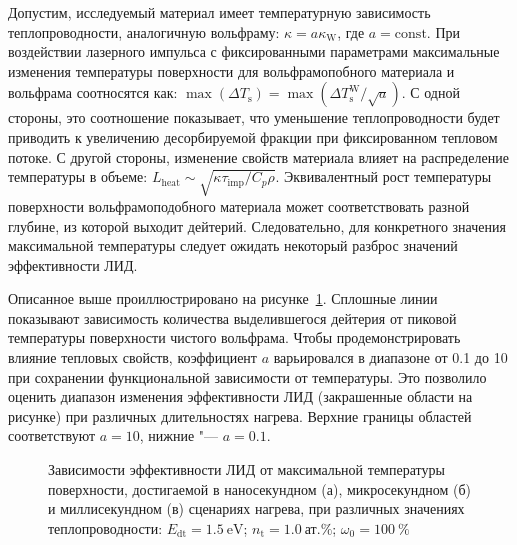 Допустим, исследуемый материал имеет температурную зависимость теплопроводности, аналогичную вольфраму: \( \kappa = a\kappa_\mathrm{W} \), где \(a=\mathrm{const}\). При воздействии лазерного импульса с фиксированными параметрами максимальные изменения температуры поверхности для вольфрамопобного материала и вольфрама соотносятся как: \( \max(\Delta T_\mathrm{s}) = \max(\Delta T_\mathrm{s}^{\mathrm{W}}/\sqrt{a}) \). С одной стороны, это соотношение показывает, что уменьшение теплопроводности будет приводить к увеличению десорбируемой фракции при фиксированном тепловом потоке. С другой стороны, изменение свойств материала влияет на распределение температуры в объеме: \(L_\mathrm{heat}\sim \sqrt{\kappa\tau_\mathrm{imp}/C_p \rho} \). Эквивалентный рост температуры поверхности вольфрамоподобного материала может соответствовать разной глубине, из которой выходит дейтерий. Следовательно, для конкретного значения максимальной температуры следует ожидать некоторый разброс значений эффективности ЛИД.

Описанное выше проиллюстрировано на рисунке~\cref{fig:ch4/LID_kappa_var}. Сплошные линии показывают зависимость количества выделившегося дейтерия от пиковой температуры поверхности чистого вольфрама. Чтобы продемонстрировать влияние тепловых свойств, коэффициент \(a\) варьировался в диапазоне от \num{0.1} до \num{10} при сохранении функциональной зависимости от температуры. Это позволило оценить диапазон изменения эффективности ЛИД (закрашенные области на рисунке) при различных длительностях нагрева. Верхние границы областей соответствуют \( a=\num{10} \), нижние "--- \( a=\num{0.1} \).
\begin{figure}[ht]
    \caption{Зависимости эффективности ЛИД от максимальной температуры поверхности, достигаемой в наносекундном (а), микросекундном (б) и миллисекундном (в) сценариях нагрева, при различных значениях теплопроводности: \(E_\mathrm{dt}=\SI{1.5}{\electronvolt}\); \(n_\mathrm{t}=\SI{1.0}{\text{ат.}\percent}\); \( \omega_0=\SI{100}{\percent}\)}\label{fig:ch4/LID_kappa_var}
\end{figure}

